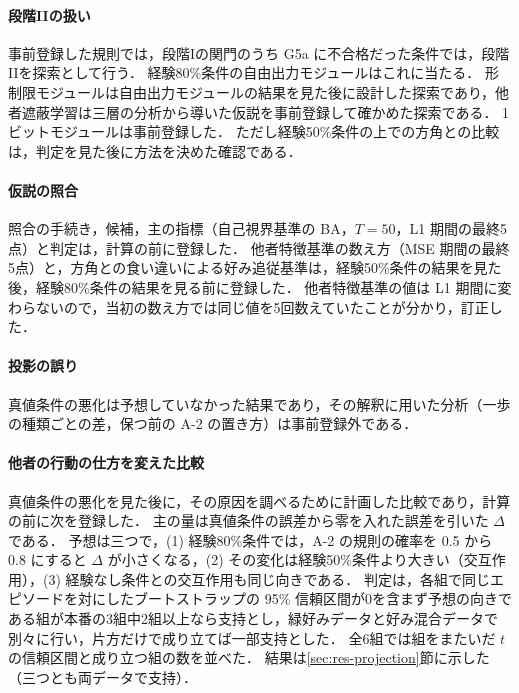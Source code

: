 \paragraph{段階IIの扱い}
事前登録した規則では，段階Iの関門のうち G5a に不合格だった条件では，段階IIを探索として行う．
経験80\%条件の自由出力モジュールはこれに当たる．
形制限モジュールは自由出力モジュールの結果を見た後に設計した探索であり，他者遮蔽学習は三層の分析から導いた仮説を事前登録して確かめた探索である．
1ビットモジュールは事前登録した．
ただし経験50\%条件の上での方角との比較は，判定を見た後に方法を決めた確認である．

\paragraph{仮説の照合}
照合の手続き，候補，主の指標（自己視界基準の BA，$T=50$，L1 期間の最終5点）と判定は，計算の前に登録した．
他者特徴基準の数え方（MSE 期間の最終5点）と，方角との食い違いによる好み追従基準は，経験50\%条件の結果を見た後，経験80\%条件の結果を見る前に登録した．
他者特徴基準の値は L1 期間に変わらないので，当初の数え方では同じ値を5回数えていたことが分かり，訂正した．

\paragraph{投影の誤り}
真値条件の悪化は予想していなかった結果であり，その解釈に用いた分析（一歩の種類ごとの差，保つ前の A-2 の置き方）は事前登録外である．

\paragraph{他者の行動の仕方を変えた比較}
真値条件の悪化を見た後に，その原因を調べるために計画した比較であり，計算の前に次を登録した．
主の量は真値条件の誤差から零を入れた誤差を引いた $\Delta$ である．
予想は三つで，(1) 経験80\%条件では，A-2 の規則の確率を 0.5 から 0.8 にすると $\Delta$ が小さくなる，(2) その変化は経験50\%条件より大きい（交互作用），(3) 経験なし条件との交互作用も同じ向きである．
判定は，各組で同じエピソードを対にしたブートストラップの 95\% 信頼区間が0を含まず予想の向きである組が本番の3組中2組以上なら支持とし，緑好みデータと好み混合データで別々に行い，片方だけで成り立てば一部支持とした．
全6組では組をまたいだ $t$ の信頼区間と成り立つ組の数を並べた．
結果は\ref{sec:res-projection}節に示した（三つとも両データで支持）．

